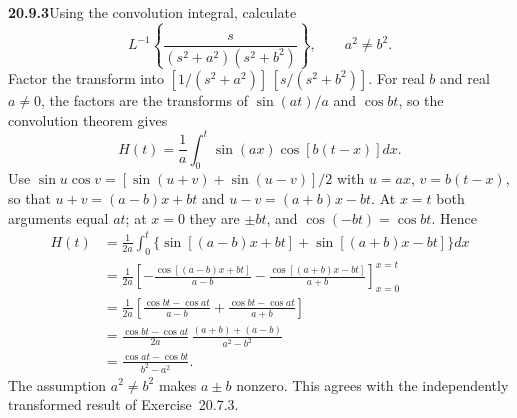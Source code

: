 \par\bigskip
\noindent\textbf{20.9.3}\quad Using the convolution integral,
calculate
\[
L^{-1}\left\{\frac{s}{(s^{2}+a^{2})(s^{2}+b^{2})}\right\},
\qquad a^{2}\ne b^{2}.
\]
\solution
Factor the transform into
$[1/(s^2+a^2)]\,[s/(s^2+b^2)]$. For real $b$ and real $a\ne0$,
the factors are the transforms of $\sin(at)/a$ and $\cos bt$, so
the convolution theorem gives
\[
H(t)=\frac1a\int_0^t\sin(ax)\cos[b(t-x)]dx.
\]
Use $\sin u\cos v=[\sin(u+v)+\sin(u-v)]/2$ with $u=ax$,
$v=b(t-x)$, so that $u+v=(a-b)x+bt$ and $u-v=(a+b)x-bt$.
At $x=t$ both arguments equal $at$; at $x=0$ they are $\pm bt$,
and $\cos(-bt)=\cos bt$. Hence
\begin{align*}
H(t)&=\frac1{2a}\int_0^t
\{\sin[(a-b)x+bt]+\sin[(a+b)x-bt]\}dx\\
&=\frac1{2a}\left[-\frac{\cos[(a-b)x+bt]}{a-b}
-\frac{\cos[(a+b)x-bt]}{a+b}\right]_{x=0}^{x=t}\\
&=\frac1{2a}\left[
\frac{\cos bt-\cos at}{a-b}
+\frac{\cos bt-\cos at}{a+b}\right]\\
&=\frac{\cos bt-\cos at}{2a}\,
\frac{(a+b)+(a-b)}{a^2-b^2}\\
&=\boxed{\frac{\cos at-\cos bt}{b^2-a^2}}.
\end{align*}
The assumption $a^2\ne b^2$ makes $a\pm b$ nonzero.
This agrees with the independently transformed result of
Exercise~20.7.3.

